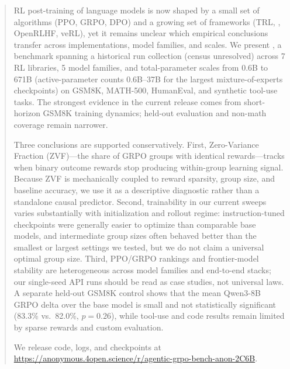\begin{abstract}
RL post-training of language models is now shaped by a small set of
algorithms (PPO, GRPO, DPO) and a growing set of frameworks (TRL,
\tinker{}, OpenRLHF, veRL), yet it remains unclear which empirical conclusions
transfer across implementations, model families, and scales. We present
\ours{}, a benchmark spanning a historical run collection (census unresolved) across 7 RL libraries, 5 model
families, and total-parameter scales from 0.6B to 671B (active-parameter
counts 0.6B--37B for the largest mixture-of-experts checkpoints) on GSM8K,
MATH-500, HumanEval, and synthetic tool-use tasks. The strongest evidence in
the current release comes from short-horizon GSM8K training dynamics; held-out
evaluation and non-math coverage remain narrower.

Three conclusions are supported conservatively. First, Zero-Variance Fraction
(ZVF)---the share of GRPO groups with identical rewards---tracks when binary
outcome rewards stop producing within-group learning signal. Because ZVF is
mechanically coupled to reward sparsity, group size, and baseline accuracy, we
use it as a descriptive diagnostic rather than a standalone causal predictor.
Second, trainability in our current sweeps varies substantially with
initialization and rollout regime: instruction-tuned checkpoints were
generally easier to optimize than comparable base models, and intermediate
group sizes often behaved better than the smallest or largest settings we
tested, but we do not claim a universal optimal group size. Third, PPO/GRPO
rankings and frontier-model stability are heterogeneous across model families
and end-to-end stacks; our single-seed API runs should be read as case studies,
not universal laws. A separate held-out GSM8K control shows that the mean
Qwen3-8B GRPO delta over the base model is small and not statistically
significant (83.3\% vs.\ 82.0\%, $p{=}0.26$), while tool-use and code results
remain limited by sparse rewards and custom evaluation.

We release code, logs, and checkpoints at
\url{https://anonymous.4open.science/r/agentic-grpo-bench-anon-2C6B}.
\end{abstract}
